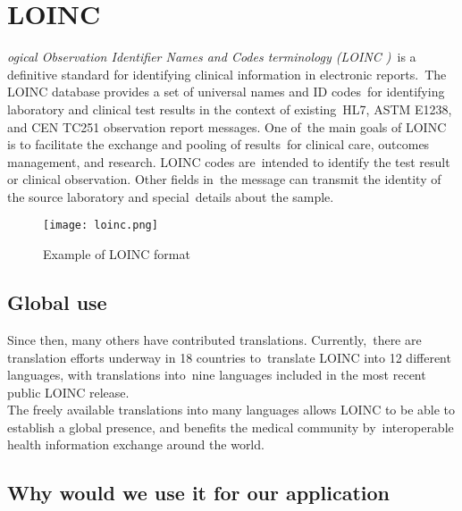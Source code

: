   \section[Logical Observation Identifier Names and Codes terminology\\
  (LOINC\textsuperscript{\textregistered})] 
  {LOINC\textsuperscript{\textregistered}}
  \label{sec:loinc}
  
  \textit{ogical Observation Identifier Names and Codes terminology (LOINC )}\
 is a definitive standard for identifying clinical information in electronic reports.\
The LOINC database provides a set of universal names and ID codes\ 
for identifying laboratory and clinical test results in the context of existing\
 HL7, ASTM E1238, and CEN TC251 observation report messages. One of\
 the main goals of LOINC is to facilitate the exchange and pooling of results\
 for clinical care, outcomes management, and research. LOINC codes are\
 intended to identify the test result or clinical observation. Other fields in\
 the message can transmit the identity of the source laboratory and special\
details about the sample.\citep{_Vreeman_2013}\

 \begin{figure}[ht!]
    \centering
    \texttt{[image: loinc.png]}
    \caption{Example of LOINC format\citep{_loinc_manual_2013}}
    \label{fig:loinc}
  \end{figure}  

\subsection{Global use}

Since then, many others have contributed translations. Currently,\
there are translation efforts underway in 18 countries to\
translate LOINC into 12 different languages, with translations into\
nine languages included in the most recent public LOINC release.\\

The freely available translations into many languages allows LOINC to\noindent
be able to establish a global presence, and benefits the medical community by\
interoperable health information exchange around the world.\citep{vreeman_enabling_2012}\

 \subsection{Why would we use it for our application}

